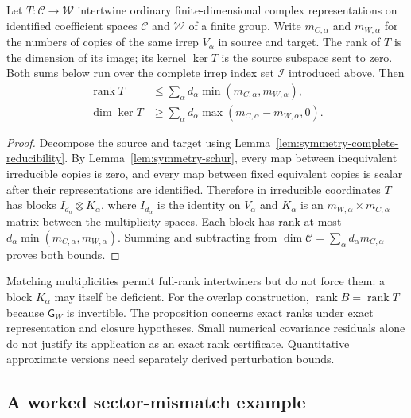 \begin{proposition}
\label{prop:symmetry-sector-rank-bound}
Let $T:\mathcal C\to\mathcal W$ intertwine ordinary finite-dimensional
complex representations on identified coefficient spaces $\mathcal C$ and
$\mathcal W$ of a finite group. Write $m_{C,\alpha}$ and $m_{W,\alpha}$ for
the numbers of copies of the same irrep $V_\alpha$ in source and target.
The rank of $T$ is the dimension of its image; its kernel $\ker T$ is the
source subspace sent to zero. Both sums below run over the complete irrep
index set $\mathcal I$ introduced above. Then
\begin{align}
  \operatorname{rank}T
    &\leq\sum_\alpha d_\alpha
        \min(m_{C,\alpha},m_{W,\alpha}),
    \label{eq:symmetry-intertwiner-rank-bound}\\
  \dim\ker T
    &\geq\sum_\alpha d_\alpha
        \max(m_{C,\alpha}-m_{W,\alpha},0).
    \label{eq:symmetry-intertwiner-kernel-bound}
\end{align}
\end{proposition}
\begin{proof}
Decompose the source and target using
Lemma~\ref{lem:symmetry-complete-reducibility}. By
Lemma~\ref{lem:symmetry-schur}, every map between inequivalent irreducible
copies is zero, and every map between fixed equivalent copies is scalar
after their representations are identified. Therefore in irreducible
coordinates $T$ has blocks
$I_{d_\alpha}\otimes K_\alpha$, where $I_{d_\alpha}$ is the identity on
$V_\alpha$ and $K_\alpha$ is an $m_{W,\alpha}\times m_{C,\alpha}$ matrix
between the multiplicity spaces. Each block has rank at most
$d_\alpha\min(m_{C,\alpha},m_{W,\alpha})$. Summing and subtracting from
$\dim\mathcal C=\sum_\alpha d_\alpha m_{C,\alpha}$ proves both bounds.
\end{proof}

Matching multiplicities permit full-rank intertwiners but do not force them:
a block $K_\alpha$ may itself be deficient. For the overlap construction,
$\operatorname{rank}B=\operatorname{rank}T$ because $\mathsf G_W$ is invertible.
The proposition concerns exact ranks under exact representation and closure
hypotheses. Small numerical covariance residuals alone do not justify its
application as an exact rank certificate. Quantitative approximate versions
need separately derived perturbation bounds.

\subsection{A worked sector-mismatch example}

